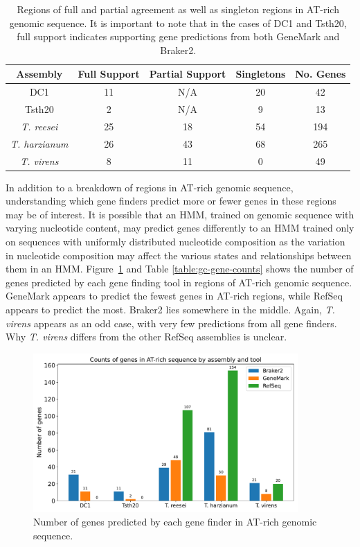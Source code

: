 \begin{table}
  \begin{center}
    \begin{tabular}{|c|c|c|c|c|}
      \hline
      Assembly & Full Support & Partial Support & Singletons & No. Genes \\ \hline
      DC1 & 11 & N/A & 20 & 42  \\ \hline
      Tsth20 & 2 & N/A & 9 & 13  \\ \hline
      \textit{T. reesei} & 25 & 18 & 54 & 194  \\ \hline
      \textit{T. harzianum} & 26 & 43 & 68 & 265  \\ \hline
      \textit{T. virens} & 8 & 11 & 0 & 49  \\ \hline
    \end{tabular}
  \end{center}
  \caption[Agreement of predictions in anomalous GC regions.]{Regions of full and partial agreement as well as singleton regions in AT-rich
    genomic sequence. It is important to note that in the cases of DC1
    and Tsth20, full support indicates supporting gene predictions
    from both GeneMark and Braker2.}
  \label{table:gc-regions}
\end{table}

In addition to a breakdown of regions in AT-rich genomic sequence,
understanding which gene finders predict more or fewer genes in these
regions may be of interest. It is possible that an HMM, trained on
genomic sequence with varying nucleotide content, may predict genes
differently to an HMM trained only on sequences with uniformly
distributed nucleotide composition as the variation in nucleotide
composition may affect the various states and relationships between
them in an HMM. Figure~\ref{fig:gc-gene-counts} and Table \ref{table:gc-gene-counts} shows the number of
genes predicted by each gene finding tool in regions of AT-rich
genomic sequence. GeneMark appears to predict the fewest genes in
AT-rich regions, while RefSeq appears to predict the most. Braker2
lies somewhere in the middle. Again, \textit{T. virens} appears as an
odd case, with very few predictions from all gene finders. Why
\textit{T. virens} differs from the other RefSeq assemblies is
unclear.

\begin{figure}
  \centering
  \includegraphics[width=0.90\textwidth]{figures/atrich-genes-barplot.pdf}
  \caption{Number of genes predicted by each gene finder in AT-rich genomic sequence.}
  \label{fig:gc-gene-counts}
\end{figure}

